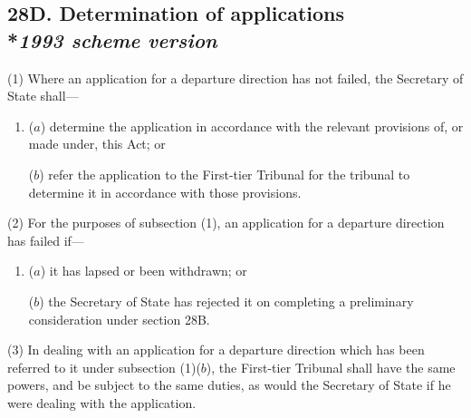 \documentclass[12pt,a4paper]{article}
\begin{document}

\subsection[28D. Determination of applications --- \emph{1993 scheme version}]{28D. Determination of applications\\*\emph{1993 scheme version}}

(1) Where an application for a departure direction has not failed, the Secretary of State shall—
\begin{enumerate}\item[]
($a$) determine the application in accordance with the relevant provisions of, or made under, this Act; or

($b$) refer the application to 
the First-tier Tribunal  %
for the tribunal to determine it in accordance with those provisions.
\end{enumerate}

(2) For the purposes of subsection (1), an application for a departure direction has failed if—
\begin{enumerate}\item[]
($a$) it has lapsed or been withdrawn; or

($b$) the Secretary of State has rejected it on completing a preliminary consideration under section 28B.
\end{enumerate}

(3) In dealing with an application for a departure direction which has been referred to it under subsection (1)($b$), 
the First-tier Tribunal  %
shall have the same powers, and be subject to the same duties, as would the Secretary of State if he were dealing with the application.
\end{document}
